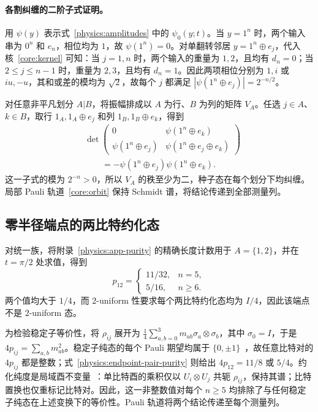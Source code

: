 \paragraph*{各割纠缠的二阶子式证明。}
用 $\psi(y)$ 表示式~\eqref{physics:amplitudes} 中的 $\psi_0(y;t)$。当 $y=1^n$ 时，两个输入串为 $0^n$ 和 $e_n$，相位均为 $1$，故 $\psi(1^n)=0$。对单翻转邻居 $y=1^n\oplus e_j$，代入核~\eqref{core:kernel} 可知：当 $j=1,n$ 时，两个输入的重量为 $1,2$，且均有 $d_n=0$；当 $2\le j\le n-1$ 时，重量为 $2,3$，且均有 $d_n=1$。因此两项相位分别为 $1,i$ 或 $iu,-u$，其和或差的模均为 $\sqrt2$，故每个 $j$ 都满足 $|\psi(1^n\oplus e_j)|=2^{-n/2}$。

对任意非平凡划分 $A|B$，将振幅排成以 $A$ 为行、$B$ 为列的矩阵 $V_A$。任选 $j\in A$、$k\in B$，取行 $1_A,1_A\oplus e_j$ 和列 $1_B,1_B\oplus e_k$，得到
\[
 \begin{aligned}
 &\det\begin{pmatrix}
 0&\psi(1^n\oplus e_k)\\
 \psi(1^n\oplus e_j)&\psi(1^n\oplus e_j\oplus e_k)
 \end{pmatrix}\\
 &\qquad=-\psi(1^n\oplus e_j)\psi(1^n\oplus e_k).
 \end{aligned}
\]
这一子式的模为 $2^{-n}>0$，所以 $V_A$ 的秩至少为二，种子态在每个划分下均纠缠。局部 Pauli 轨道~\eqref{core:orbit} 保持 Schmidt 谱，将结论传递到全部测量列。

\subsection{零半径端点的两比特约化态}
\label{physics:app-invariants}

对统一族，将附录~\ref{physics:app-purity} 的精确长度计数用于 $A=\{1,2\}$，并在 $t=\pi/2$ 处求值，得到
\begin{equation}
 p_{12}=\begin{cases}11/32,&n=5,\\5/16,&n\ge6.\end{cases}
 \label{physics:endpoint-pair-purity}
\end{equation}
两个值均大于 $1/4$，而 $2$-uniform 性要求每个两比特约化态均为 $I/4$，因此该端点不是 $2$-uniform 态。

为检验稳定子等价性，将 $\rho_{ij}$ 展开为 $\tfrac14\sum_{a,b=0}^3m_{ab}\sigma_a\otimes\sigma_b$，其中 $\sigma_0=I$，于是 $4p_{ij}=\sum_{a,b}m_{ab}^2$。稳定子纯态的每个 Pauli 期望均属于 $\{0,\pm1\}$~\cite{Gottesman1997}，故任意比特对的 $4p_{ij}$ 都是整数；式~\eqref{physics:endpoint-pair-purity} 则给出 $4p_{12}=11/8$ 或 $5/4$。约化纯度是局域酉不变量~\cite{Grassl1998}：单比特酉的乘积仅以 $U_i\otimes U_j$ 共轭 $\rho_{ij}$，保持其谱；比特置换也仅重标记比特对。因此，这一非整数值对每个 $n\ge5$ 均排除了与任何稳定子纯态在上述变换下的等价性。Pauli 轨道将两个结论传递至每个测量列。


